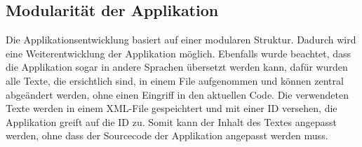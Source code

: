 \subsection{Modularität der Applikation}

Die Applikationsentwicklung basiert auf einer modularen Struktur.  Dadurch wird eine Weiterentwicklung der Applikation möglich. Ebenfalls wurde beachtet, dass die Applikation sogar in andere Sprachen übersetzt werden kann, dafür wurden alle Texte, die ersichtlich sind, in einem File aufgenommen und können zentral abgeändert werden, ohne einen Eingriff in den aktuellen Code. Die verwendeten Texte werden in einem XML-File gespeichtert und mit einer ID versehen, die Applikation greift auf die ID zu. Somit kann der Inhalt des Textes angepasst werden, ohne dass der Sourcecode der Applikation angepasst werden muss.






